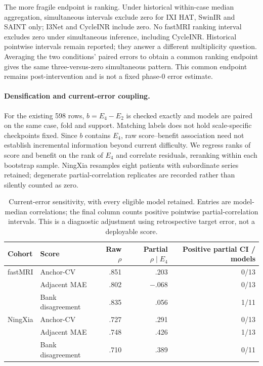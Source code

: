 The more fragile endpoint is ranking. Under historical within-case median aggregation, simultaneous intervals exclude zero for IXI HAT, SwinIR and SAINT only; I3Net and CycleINR include zero. No fastMRI ranking interval excludes zero under simultaneous inference, including CycleINR. Historical pointwise intervals remain reported; they answer a different multiplicity question. Averaging the two conditions' paired errors to obtain a common ranking endpoint gives the same three-versus-zero simultaneous pattern. This common endpoint remains post-intervention and is not a fixed phase-0 error estimate.

\paragraph{Densification and current-error coupling.}
For the existing 598 rows, $b=E_4-E_2$ is checked exactly and models are paired on the same case, fold and support. Matching labels does not hold scale-specific checkpoints fixed. Since $b$ contains $E_4$, raw score--benefit association need not establish incremental information beyond current difficulty. We regress ranks of score and benefit on the rank of $E_4$ and correlate residuals, reranking within each bootstrap sample. NingXia resamples eight patients with subordinate series retained; degenerate partial-correlation replicates are recorded rather than silently counted as zero.

\begin{table}[t]
\centering\small
\caption{Current-error sensitivity, with every eligible model retained. Entries are model-median correlations; the final column counts positive pointwise partial-correlation intervals. This is a diagnostic adjustment using retrospective target error, not a deployable score.}
\begin{tabular}{llrrr}
\toprule
Cohort&Score&Raw $\rho$&Partial $\rho\mid E_4$&Positive partial CI / models\\
\midrule
fastMRI&Anchor-CV&.851&.203&0/13\\
&Adjacent MAE&.802&$-.068$&0/13\\
&Bank disagreement&.835&.056&1/11\\
NingXia&Anchor-CV&.727&.291&0/13\\
&Adjacent MAE&.748&.426&1/13\\
&Bank disagreement&.710&.389&0/11\\
\bottomrule
\end{tabular}
\end{table}

